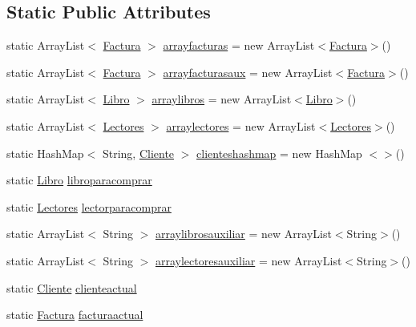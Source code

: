 \subsection*{Static Public Attributes}
\begin{DoxyCompactItemize}
\item 
static Array\+List$<$ \mbox{\hyperlink{classlibreria_1_1_factura}{Factura}} $>$ \mbox{\hyperlink{classlibreria_1_1_libreria_a1b6aaea2b6d1d95a7e25b85881e82721}{arrayfacturas}} = new Array\+List$<$\mbox{\hyperlink{classlibreria_1_1_factura}{Factura}}$>$()
\item 
static Array\+List$<$ \mbox{\hyperlink{classlibreria_1_1_factura}{Factura}} $>$ \mbox{\hyperlink{classlibreria_1_1_libreria_a29c40164090c7a129f082735a0d15664}{arrayfacturasaux}} = new Array\+List$<$\mbox{\hyperlink{classlibreria_1_1_factura}{Factura}}$>$()
\item 
static Array\+List$<$ \mbox{\hyperlink{classlibreria_1_1_libro}{Libro}} $>$ \mbox{\hyperlink{classlibreria_1_1_libreria_aa55c2bad2db92eb94ea1ba9c6997f47d}{arraylibros}} = new Array\+List$<$\mbox{\hyperlink{classlibreria_1_1_libro}{Libro}}$>$()
\item 
static Array\+List$<$ \mbox{\hyperlink{classlibreria_1_1_lectores}{Lectores}} $>$ \mbox{\hyperlink{classlibreria_1_1_libreria_ac9e002dcb370eb6caa314d18cf14a293}{arraylectores}} = new Array\+List$<$\mbox{\hyperlink{classlibreria_1_1_lectores}{Lectores}}$>$()
\item 
static Hash\+Map$<$ String, \mbox{\hyperlink{classlibreria_1_1_cliente}{Cliente}} $>$ \mbox{\hyperlink{classlibreria_1_1_libreria_a9bb86627af6c43f97367c8a28d9f0d3e}{clienteshashmap}} = new Hash\+Map $<$$>$()
\item 
static \mbox{\hyperlink{classlibreria_1_1_libro}{Libro}} \mbox{\hyperlink{classlibreria_1_1_libreria_a020582c6fff65be09a8f61c6f9bb19e1}{libroparacomprar}}
\item 
static \mbox{\hyperlink{classlibreria_1_1_lectores}{Lectores}} \mbox{\hyperlink{classlibreria_1_1_libreria_adb43b6e9fa686d822bddeca29dbdba84}{lectorparacomprar}}
\item 
static Array\+List$<$ String $>$ \mbox{\hyperlink{classlibreria_1_1_libreria_a419cfdeb78bb0c7d9af85e493121fc34}{arraylibrosauxiliar}} = new Array\+List$<$String$>$()
\item 
static Array\+List$<$ String $>$ \mbox{\hyperlink{classlibreria_1_1_libreria_a01d26185581990bccbe9041740911af9}{arraylectoresauxiliar}} = new Array\+List$<$String$>$()
\item 
static \mbox{\hyperlink{classlibreria_1_1_cliente}{Cliente}} \mbox{\hyperlink{classlibreria_1_1_libreria_afcc53a4ee673ee845bc07288aa5c7181}{clienteactual}}
\item 
static \mbox{\hyperlink{classlibreria_1_1_factura}{Factura}} \mbox{\hyperlink{classlibreria_1_1_libreria_a7255df1dedc7a1d54c8573043a435574}{facturaactual}}
\end{DoxyCompactItemize}


